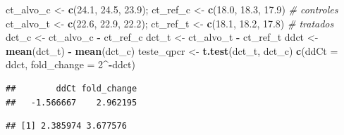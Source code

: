 \documentclass[
]{book}
\newenvironment{Shaded}{\begin{snugshade}}{\end{snugshade}}
\newcommand{\AttributeTok}[1]{\textcolor[rgb]{0.13,0.29,0.53}{#1}}
\newcommand{\CommentTok}[1]{\textcolor[rgb]{0.56,0.35,0.01}{\textit{#1}}}
\newcommand{\DecValTok}[1]{\textcolor[rgb]{0.00,0.00,0.81}{#1}}
\newcommand{\FloatTok}[1]{\textcolor[rgb]{0.00,0.00,0.81}{#1}}
\newcommand{\FunctionTok}[1]{\textcolor[rgb]{0.13,0.29,0.53}{\textbf{#1}}}
\newcommand{\NormalTok}[1]{#1}
\newcommand{\OtherTok}[1]{\textcolor[rgb]{0.56,0.35,0.01}{#1}}
\newcommand{\SpecialCharTok}[1]{\textcolor[rgb]{0.81,0.36,0.00}{\textbf{#1}}}
\begin{document}
\begin{Shaded}
\begin{Highlighting}[]
\NormalTok{ct\_alvo\_c }\OtherTok{\textless{}{-}} \FunctionTok{c}\NormalTok{(}\FloatTok{24.1}\NormalTok{, }\FloatTok{24.5}\NormalTok{, }\FloatTok{23.9}\NormalTok{); ct\_ref\_c }\OtherTok{\textless{}{-}} \FunctionTok{c}\NormalTok{(}\FloatTok{18.0}\NormalTok{, }\FloatTok{18.3}\NormalTok{, }\FloatTok{17.9}\NormalTok{)   }\CommentTok{\# controles}
\NormalTok{ct\_alvo\_t }\OtherTok{\textless{}{-}} \FunctionTok{c}\NormalTok{(}\FloatTok{22.6}\NormalTok{, }\FloatTok{22.9}\NormalTok{, }\FloatTok{22.2}\NormalTok{); ct\_ref\_t }\OtherTok{\textless{}{-}} \FunctionTok{c}\NormalTok{(}\FloatTok{18.1}\NormalTok{, }\FloatTok{18.2}\NormalTok{, }\FloatTok{17.8}\NormalTok{)   }\CommentTok{\# tratados}
\NormalTok{dct\_c }\OtherTok{\textless{}{-}}\NormalTok{ ct\_alvo\_c }\SpecialCharTok{{-}}\NormalTok{ ct\_ref\_c}
\NormalTok{dct\_t }\OtherTok{\textless{}{-}}\NormalTok{ ct\_alvo\_t }\SpecialCharTok{{-}}\NormalTok{ ct\_ref\_t}
\NormalTok{ddct }\OtherTok{\textless{}{-}} \FunctionTok{mean}\NormalTok{(dct\_t) }\SpecialCharTok{{-}} \FunctionTok{mean}\NormalTok{(dct\_c)}
\NormalTok{teste\_qpcr }\OtherTok{\textless{}{-}} \FunctionTok{t.test}\NormalTok{(dct\_t, dct\_c)}
\FunctionTok{c}\NormalTok{(}\AttributeTok{ddCt =}\NormalTok{ ddct, }\AttributeTok{fold\_change =} \DecValTok{2}\SpecialCharTok{\^{}{-}}\NormalTok{ddct)}
\end{Highlighting}
\end{Shaded}

\begin{verbatim}
##        ddCt fold_change 
##   -1.566667    2.962195
\end{verbatim}

\begin{Shaded}
\end{Shaded}

\begin{verbatim}
## [1] 2.385974 3.677576
\end{verbatim}

\begin{Shaded}
\end{Shaded}
\end{document}

